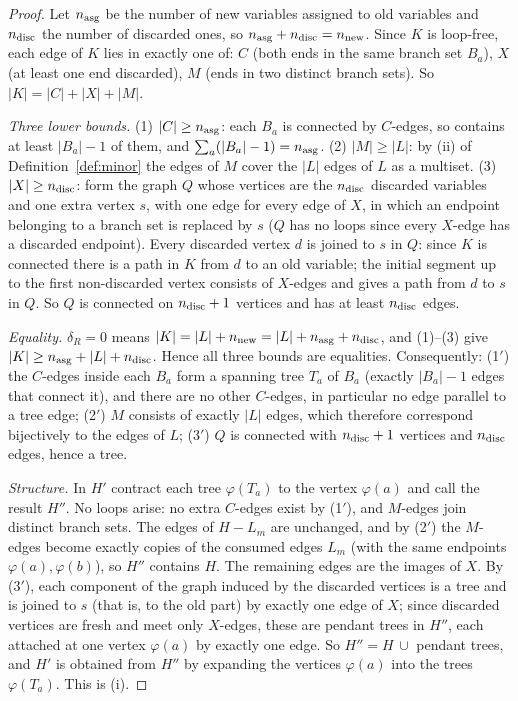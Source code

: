 \documentclass[10pt]{article}
\theoremstyle{definition}
\theoremstyle{plain}
\theoremstyle{remark}
\begin{document}
\begin{proof}
Let $n_{\rm asg}$ be the number of new variables assigned to old variables and $n_{\rm disc}$ the number of discarded ones, so $n_{\rm asg}+n_{\rm disc}=n_{\rm new}$. Since $K$ is loop-free, each edge of $K$ lies in exactly one of: $C$ (both ends in the same branch set $B_a$), $X$ (at least one end discarded), $M$ (ends in two distinct branch sets). So $|K|=|C|+|X|+|M|$.

\emph{Three lower bounds.} (1) $|C|\ge n_{\rm asg}$: each $B_a$ is connected by $C$-edges, so contains at least $|B_a|-1$ of them, and $\sum_a(|B_a|-1)=n_{\rm asg}$. (2) $|M|\ge|L|$: by (ii) of Definition~\ref{def:minor} the edges of $M$ cover the $|L|$ edges of $L$ as a multiset. (3) $|X|\ge n_{\rm disc}$: form the graph $Q$ whose vertices are the $n_{\rm disc}$ discarded variables and one extra vertex $s$, with one edge for every edge of $X$, in which an endpoint belonging to a branch set is replaced by $s$ ($Q$ has no loops since every $X$-edge has a discarded endpoint). Every discarded vertex $d$ is joined to $s$ in $Q$: since $K$ is connected there is a path in $K$ from $d$ to an old variable; the initial segment up to the first non-discarded vertex consists of $X$-edges and gives a path from $d$ to $s$ in $Q$. So $Q$ is connected on $n_{\rm disc}+1$ vertices and has at least $n_{\rm disc}$ edges.

\emph{Equality.} $\delta_R=0$ means $|K|=|L|+n_{\rm new}=|L|+n_{\rm asg}+n_{\rm disc}$, and (1)--(3) give $|K|\ge n_{\rm asg}+|L|+n_{\rm disc}$. Hence all three bounds are equalities. Consequently: (1$'$) the $C$-edges inside each $B_a$ form a spanning tree $T_a$ of $B_a$ (exactly $|B_a|-1$ edges that connect it), and there are no other $C$-edges, in particular no edge parallel to a tree edge; (2$'$) $M$ consists of exactly $|L|$ edges, which therefore correspond bijectively to the edges of $L$; (3$'$) $Q$ is connected with $n_{\rm disc}+1$ vertices and $n_{\rm disc}$ edges, hence a tree.

\emph{Structure.} In $H'$ contract each tree $\varphi(T_a)$ to the vertex $\varphi(a)$ and call the result $H''$. No loops arise: no extra $C$-edges exist by (1$'$), and $M$-edges join distinct branch sets. The edges of $H-L_m$ are unchanged, and by (2$'$) the $M$-edges become exactly copies of the consumed edges $L_m$ (with the same endpoints $\varphi(a),\varphi(b)$), so $H''$ contains $H$. The remaining edges are the images of $X$. By (3$'$), each component of the graph induced by the discarded vertices is a tree and is joined to $s$ (that is, to the old part) by exactly one edge of $X$; since discarded vertices are fresh and meet only $X$-edges, these are pendant trees in $H''$, each attached at one vertex $\varphi(a)$ by exactly one edge. So $H''=H\,\cup$ pendant trees, and $H'$ is obtained from $H''$ by expanding the vertices $\varphi(a)$ into the trees $\varphi(T_a)$. This is (i).


\end{proof}
\end{document}
